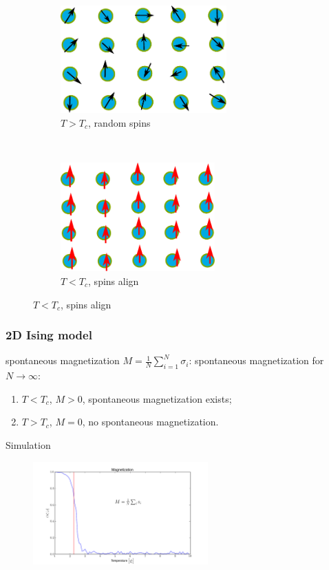 \documentclass[notheorems]{beamer}
\begin{document}
\begin{frame}
\begin{columns}
	\end{columns}
\begin{figure}
	\centering
	\begin{subfigure}{0.4\textwidth}
		\includegraphics[width=0.7\textwidth]{Tlarge.pdf}
		\caption{$T>T_c$, random spins}
	\end{subfigure}~
	\begin{subfigure}{0.4\textwidth}
		\includegraphics[width=0.65\textwidth]{Tsmall.pdf}
		\caption{$T<T_c$, spins align}
	\end{subfigure}
\end{figure}
\end{frame}
\begin{frame}
\frametitle{2D Ising model}	
\begin{block}{spontaneous magnetization}
	$M = \frac{1}{N} \sum_{i=1}^N \sigma_i$: spontaneous magnetization for $N\to \infty$:
	\begin{enumerate}
		\item $T< T_c$, $M>0$, spontaneous magnetization exists;
		\item $T> T_c$, $M=0$, no spontaneous magnetization.
	\end{enumerate}
\end{block}
Simulation
\begin{figure}
\includegraphics[width=0.6\textwidth]{monte-carlo-ising-6.png}
\end{figure}
\end{frame}
\end{document}
